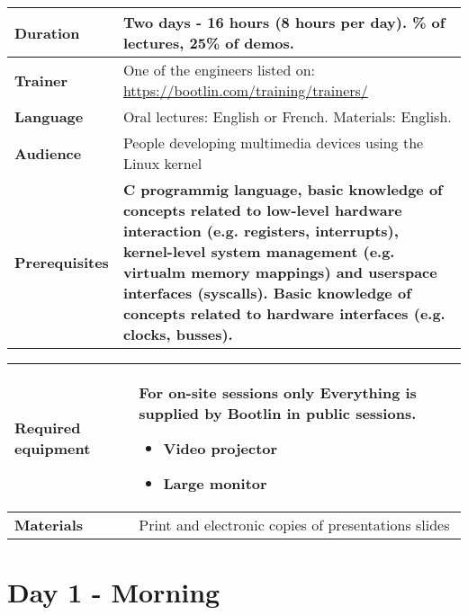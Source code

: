 \documentclass[a4paper,12pt,obeyspaces,spaces,hyphens]{article}
\begin{document}
{\begin{tabularx}{\textwidth}{|g|h|}
    {\bf Duration} & {\bf Two} days - 16 hours (8 hours per day).
    \% of lectures, 25\% of demos. \\
    \hline

    {\bf Trainer} & One of the engineers listed on:
    \newline \url{https://bootlin.com/training/trainers/}\\
    \hline

    {\bf Language} & Oral lectures: English or French.
    \newline Materials: English.\\
    \hline

    {\bf Audience} & People developing multimedia devices using the Linux kernel\\
    \hline

    {\bf Prerequisites} &
    {\bf C programmig language, basic knowledge of concepts related to low-level
    hardware interaction (e.g. registers, interrupts),
    kernel-level system management (e.g. virtualm memory mappings) and
    userspace interfaces (syscalls).
    Basic knowledge of concepts related to hardware interfaces
    (e.g. clocks, busses).}\\
    \hline

  \end{tabularx}

  \begin{tabularx}{\textwidth}{|g|h|}
    {\bf Required equipment} &
    {\bf For on-site sessions only}
    \newline Everything is supplied by Bootlin in public sessions.
    \begin{itemize}
    \item Video projector
    \item Large monitor
    \end{itemize}\\
    \hline

    {\bf Materials} & Print and electronic copies of presentations slides\\
    \hline

\end{tabularx}}
\normalsize

\section{Day 1 - Morning}
\end{document}
